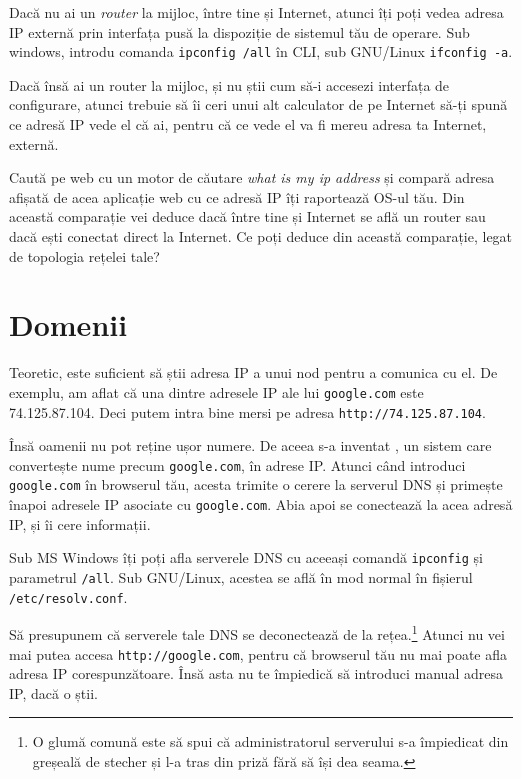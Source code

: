 
Dacă nu ai un \textsl{router} la mijloc, între tine și Internet, atunci îți poți vedea adresa IP
externă prin interfața pusă la dispoziție de sistemul tău de operare. Sub windows, introdu
comanda \texttt{ipconfig /all} în CLI, sub GNU/Linux \texttt{ifconfig -a}.

Dacă însă ai un router la mijloc, și nu știi cum să-i accesezi interfața de configurare,
atunci trebuie să îi ceri unui alt calculator de pe Internet să-ți spună ce adresă IP
vede el că ai, pentru că ce vede el va fi mereu adresa ta Internet, externă.

\begin{Exercise}[title={What is my IP Address?},difficulty=1]
Caută pe web cu un motor de căutare \textit{what is my ip address} și compară
adresa afișată de acea aplicație web cu ce adresă IP îți raportează OS-ul tău.
Din această comparație vei deduce dacă între tine și Internet se află un router sau dacă ești conectat direct la Internet.
Ce poți deduce din această comparație, legat de topologia rețelei tale?
\end{Exercise}

\section{Domenii}
Teoretic, este suficient să știi adresa IP a unui nod pentru a comunica cu el. De exemplu,
am aflat că una dintre adresele IP ale lui \texttt{google.com} este 74.125.87.104. Deci putem
intra bine mersi pe adresa \texttt{http://74.125.87.104}.

Însă oamenii nu pot reține ușor numere. De aceea s-a inventat ,
un sistem care convertește nume precum \texttt{google.com}, în adrese IP. Atunci când introduci
\texttt{google.com} în browserul tău, acesta trimite o cerere la serverul DNS și primește
înapoi adresele IP asociate cu \texttt{google.com}. Abia apoi se conectează la acea adresă IP,
și îi cere informații.

Sub MS Windows îți poți afla serverele DNS cu aceeași comandă \texttt{ipconfig} și parametrul
\texttt{/all}. Sub GNU/Linux, acestea se află în mod normal în fișierul \texttt{/etc/resolv.conf}.

Să presupunem că serverele tale DNS se deconectează de la rețea.\footnote{O glumă
comună este să spui că administratorul serverului s-a împiedicat din greșeală de stecher
și l-a tras din priză fără să își dea seama.} Atunci nu vei mai putea accesa \texttt{http://google.com},
pentru că browserul tău nu mai poate afla adresa IP corespunzătoare. Însă asta nu te împiedică
să introduci manual adresa IP, dacă o știi.

